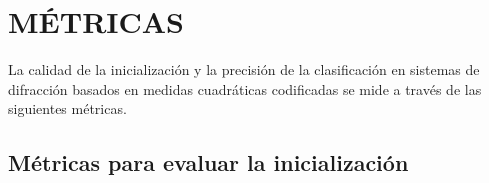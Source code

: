 \begin{table}[!h]
\centering{}\caption{Resumen de la división de los conjuntos de datos usados para evaluar el método propuesto.}
\label{tab:conjunto_datos}
\end{table}

\section{MÉTRICAS}
La calidad de la inicialización y la precisión de la clasificación en sistemas de difracción basados en medidas cuadráticas codificadas se mide a través de las siguientes métricas.
\subsection{Métricas para evaluar la inicialización}

